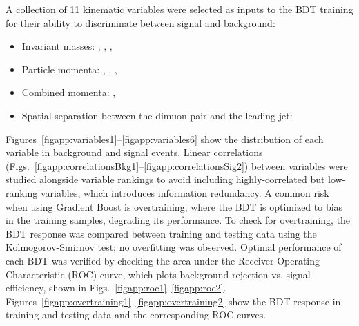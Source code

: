A collection of 11 kinematic variables were selected as inputs to the BDT training for their ability to discriminate between signal and background: 
\begin{itemize}
    \item Invariant masses: \Muu, \Muujj, \MujOne, \MujTwo
    \item Particle momenta: \ptof{\PmuOne}, \ptof{\PmuTwo}, \ptof{\PjOne}, \ptof{\PjTwo}
    \item Combined momenta: \ST, \MET
    \item Spatial separation between the dimuon pair and the leading-\pt jet: \DRof{\PmuOne+\PmuTwo}{\PjOne}
\end{itemize}
Figures~\ref{figapp:variables1}--\ref{figapp:variables6} show the distribution of each variable in background and signal events. Linear correlations (Figs.~\ref{figapp:correlationsBkg1}--\ref{figapp:correlationsSig2}) between variables were studied alongside variable rankings to avoid including highly-correlated but low-ranking variables, which introduces information redundancy. A common risk when using Gradient Boost is overtraining, where the BDT is optimized to bias in the training samples, degrading its performance. To check for overtraining, the BDT response was compared between training and testing data using the Kolmogorov-Smirnov test; no overfitting was observed. Optimal performance of each BDT was verified by checking the area under the Receiver Operating Characteristic (ROC) curve, which plots background rejection vs. signal efficiency, shown in Figs.~\ref{figapp:roc1}--\ref{figapp:roc2}. Figures~\ref{figapp:overtraining1}--\ref{figapp:overtraining2} show the BDT response in training and testing data and the corresponding ROC curves.

